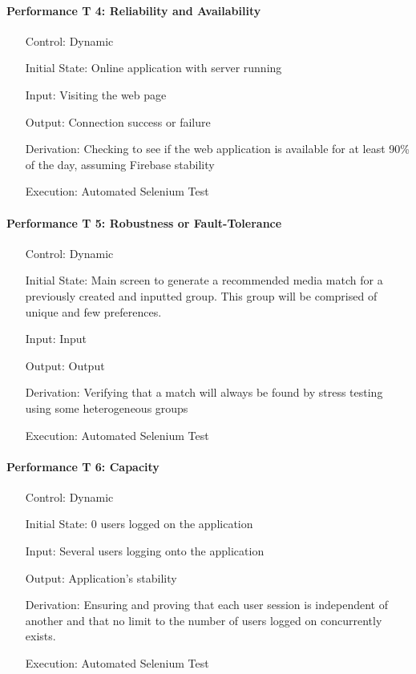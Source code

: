 \documentclass[12pt, titlepage]{article}
\begin{document}
\paragraph*{Performance T 4: Reliability and Availability}
\begin{itemize}
	\item[Control:] Dynamic
	\item[Initial State:] Online application with server running
	\item[Input:] Visiting the web page
	\item[Output:] Connection success or failure
	\item[Derivation:] Checking to see if the web application is available for at least 90\% of the day, assuming Firebase stability
	\item[Execution:] Automated Selenium Test
\end{itemize}


\paragraph*{Performance T 5: Robustness or Fault-Tolerance}
\begin{itemize}
	\item[Control:] Dynamic
	\item[Initial State:] Main screen to generate a recommended media match for a previously created and inputted group. This group will be comprised of unique and few preferences.
	\item[Input:] Input
	\item[Output:] Output
	\item[Derivation:] Verifying that a match will always be found by stress testing using some heterogeneous groups
	\item[Execution:] Automated Selenium Test
\end{itemize}

\paragraph*{Performance T 6: Capacity}
\begin{itemize}
	\item[Control:] Dynamic
	\item[Initial State:] 0 users logged on the application
	\item[Input:] Several users logging onto the application
	\item[Output:] Application's stability
	\item[Derivation:] Ensuring and proving that each user session is independent of another and that no
	limit to the number of users logged on concurrently exists.
	\item[Execution:] Automated Selenium Test
\end{itemize}
\end{document}
